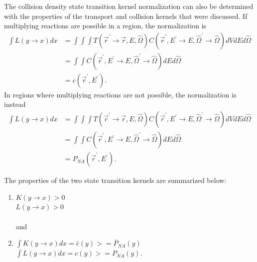 The collision density state transition kernel normalization can also be 
determined with the properties of the transport and collision kernels that 
were discussed. If multiplying reactions are possible in a region, the 
normalization is 
\begin{align}
  \int L(y \to x) dx & = \int\int\int
  T(\vec{r}^{'} \to \vec{r},E,\hat{\Omega})
  C(\vec{r}^{'},E^{'} \to E,\hat{\Omega}^{'} \to \hat{\Omega}) dV dE d\hat{\Omega}
  \nonumber \\
  & = \int\int 
  C(\vec{r}^{'},E^{'} \to E,\hat{\Omega}^{'} \to \hat{\Omega}) dE d\hat{\Omega} 
  \nonumber \\
  & = c(\vec{r}^{'},E^{'}).
\end{align}
In regions where multiplying reactions are not possible, the normalization is
instead 
\begin{align}
  \int L(y \to x) dx & = \int\int\int
  T(\vec{r}^{'} \to \vec{r},E,\hat{\Omega})
  C(\vec{r}^{'},E^{'} \to E,\hat{\Omega}^{'} \to \hat{\Omega}) dV dE d\hat{\Omega}
  \nonumber \\
  & = \int\int 
  C(\vec{r}^{'},E^{'} \to E,\hat{\Omega}^{'} \to \hat{\Omega}) dE d\hat{\Omega} 
  \nonumber \\
  & = P_{NA}(\vec{r}^{'},E^{'}).
\end{align}

The properties of the two state transition kernels are summarized below:
\begin{enumerate}
  \item $K(y \to x) > 0$ \\
    $L(y \to x) > 0$ \\ \\
    and
  \item $\int K(y \to x)dx = \bar{c}(y) >= \overline{P}_{NA}(y)$ \\
    $\int L(y \to x)dx = c(y) >= P_{NA}(y)$.
\end{enumerate}


